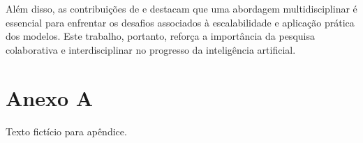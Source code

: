 	Além disso, as contribuições de \citet{rao2019} e \citet{brown2020} destacam que uma abordagem multidisciplinar é essencial para enfrentar os desafios associados à escalabilidade e aplicação prática dos modelos. Este trabalho, portanto, reforça a importância da pesquisa colaborativa e interdisciplinar no progresso da inteligência artificial.
	
	
	
	\appendix
	\chapter{Anexo A}
	Texto fictício para apêndice.
	\lipsum[10]
	

